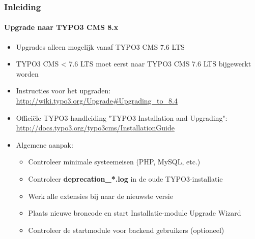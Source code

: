 \begin{frame}[fragile]
	\frametitle{Inleiding}
	\framesubtitle{Upgrade naar TYPO3 CMS 8.x}

	\begin{itemize}
		\item Upgrades alleen mogelijk vanaf TYPO3 CMS 7.6 LTS
		\item TYPO3 CMS < 7.6 LTS moet eerst naar TYPO3 CMS 7.6 LTS bijgewerkt worden 
	\end{itemize}

	\begin{itemize}

		\item Instructies voor het upgraden:\newline
			\smaller\url{http://wiki.typo3.org/Upgrade#Upgrading_to_8.4}\normalsize
		\item Officiële TYPO3-handleiding "TYPO3 Installation and Upgrading":
			\smaller\url{http://docs.typo3.org/typo3cms/InstallationGuide}\normalsize
		\item Algemene aanpak:
			\begin{itemize}
				\item Controleer minimale systeemeisen \small(PHP, MySQL, etc.)
				\item Controleer \textbf{deprecation\_*.log} in de oude TYPO3-installatie
				\item Werk alle extensies bij naar de nieuwste versie
				\item Plaats nieuwe broncode en start Installatie-module \textrightarrow Upgrade Wizard
				\item Controleer de startmodule voor backend gebruikers (optioneel)
			\end{itemize}
	\end{itemize}

\end{frame}


